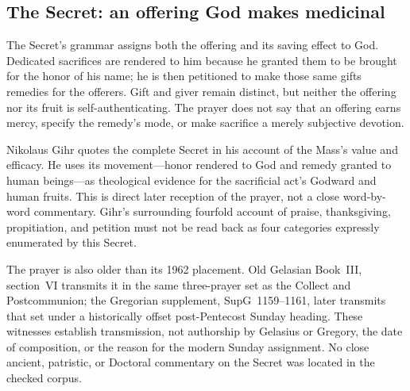 \subsection*{The Secret: an offering God makes medicinal\enspace{}}

The Secret's grammar assigns both the offering and its saving effect to God.
Dedicated sacrifices are rendered to him because he granted them to be brought
for the honor of his name; he is then petitioned to make those same gifts
remedies for the offerers. Gift and giver remain distinct, but neither the
offering nor its fruit is self-authenticating. The prayer does not say that an
offering earns mercy, specify the remedy's mode, or make sacrifice a merely
subjective devotion.

Nikolaus Gihr quotes the complete Secret in his account of the Mass's value and
efficacy. He uses its movement---honor rendered to God and remedy granted to
human beings---as theological evidence for the sacrificial act's Godward and
human fruits. This is direct later reception of the prayer, not a close
word-by-word commentary. Gihr's surrounding fourfold account of praise,
thanksgiving, propitiation, and petition must not be read back as four
categories expressly enumerated by this Secret.

The prayer is also older than its 1962 placement. Old Gelasian Book~III,
section~VI transmits it in the same three-prayer set as the Collect and
Postcommunion; the Gregorian supplement, SupG~1159--1161, later transmits that
set under a historically offset post-Pentecost Sunday heading. These witnesses
establish transmission, not authorship by Gelasius or Gregory, the date of
composition, or the reason for the modern Sunday assignment. No close ancient,
patristic, or Doctoral commentary on the Secret was located in the checked
corpus.
